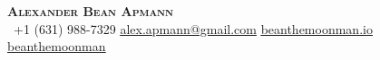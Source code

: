 \begin{center}
    \textbf{\Huge \scshape Alexander Bean Apmann} \\ \vspace{1pt}
     \ \small +1 (631) 988-7329 \quad
    \href{mailto:alex.apmann@gmail.com}{ \underline{alex.apmann@gmail.com}} \quad
    \href{https://beanthemoonman.io}{ \underline{beanthemoonman.io}} \quad
    \href{https://github.com/beanthemoonman}{ \underline{beanthemoonman}}
\end{center}